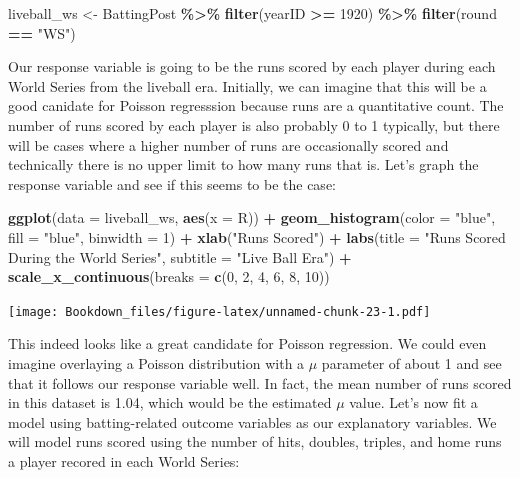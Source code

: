 \documentclass[
]{book}
\newenvironment{Shaded}{\begin{snugshade}}{\end{snugshade}}
\newcommand{\DataTypeTok}[1]{\textcolor[rgb]{0.13,0.29,0.53}{#1}}
\newcommand{\DecValTok}[1]{\textcolor[rgb]{0.00,0.00,0.81}{#1}}
\newcommand{\KeywordTok}[1]{\textcolor[rgb]{0.13,0.29,0.53}{\textbf{#1}}}
\newcommand{\NormalTok}[1]{#1}
\newcommand{\OperatorTok}[1]{\textcolor[rgb]{0.81,0.36,0.00}{\textbf{#1}}}
\newcommand{\StringTok}[1]{\textcolor[rgb]{0.31,0.60,0.02}{#1}}
\begin{document}
\begin{Shaded}
\begin{Highlighting}[]
\NormalTok{liveball\_ws \textless{}{-}}\StringTok{ }\NormalTok{BattingPost }\OperatorTok{\%\textgreater{}\%}
\StringTok{  }\KeywordTok{filter}\NormalTok{(yearID }\OperatorTok{\textgreater{}=}\StringTok{ }\DecValTok{1920}\NormalTok{) }\OperatorTok{\%\textgreater{}\%}
\StringTok{  }\KeywordTok{filter}\NormalTok{(round }\OperatorTok{==}\StringTok{ "WS"}\NormalTok{)}
\end{Highlighting}
\end{Shaded}

Our response variable is going to be the runs scored by each player during each World Series from the liveball era. Initially, we can imagine that this will be a good canidate for Poisson regresssion because runs are a quantitative count. The number of runs scored by each player is also probably 0 to 1 typically, but there will be cases where a higher number of runs are occasionally scored and technically there is no upper limit to how many runs that is. Let's graph the response variable and see if this seems to be the case:

\begin{Shaded}
\begin{Highlighting}[]
\KeywordTok{ggplot}\NormalTok{(}\DataTypeTok{data =}\NormalTok{ liveball\_ws, }\KeywordTok{aes}\NormalTok{(}\DataTypeTok{x =}\NormalTok{ R)) }\OperatorTok{+}
\StringTok{  }\KeywordTok{geom\_histogram}\NormalTok{(}\DataTypeTok{color =} \StringTok{"blue"}\NormalTok{, }\DataTypeTok{fill =} \StringTok{"blue"}\NormalTok{, }\DataTypeTok{binwidth =} \DecValTok{1}\NormalTok{) }\OperatorTok{+}
\StringTok{  }\KeywordTok{xlab}\NormalTok{(}\StringTok{"Runs Scored"}\NormalTok{) }\OperatorTok{+}
\StringTok{  }\KeywordTok{labs}\NormalTok{(}\DataTypeTok{title =} \StringTok{"Runs Scored During the World Series"}\NormalTok{, }
       \DataTypeTok{subtitle =} \StringTok{"Live Ball Era"}\NormalTok{) }\OperatorTok{+}
\StringTok{  }\KeywordTok{scale\_x\_continuous}\NormalTok{(}\DataTypeTok{breaks =} \KeywordTok{c}\NormalTok{(}\DecValTok{0}\NormalTok{, }\DecValTok{2}\NormalTok{, }\DecValTok{4}\NormalTok{, }\DecValTok{6}\NormalTok{, }\DecValTok{8}\NormalTok{, }\DecValTok{10}\NormalTok{)) }
\end{Highlighting}
\end{Shaded}

\texttt{[image: Bookdown\_files/figure-latex/unnamed-chunk-23-1.pdf]}

This indeed looks like a great candidate for Poisson regression. We could even imagine overlaying a Poisson distribution with a \(\mu\) parameter of about 1 and see that it follows our response variable well. In fact, the mean number of runs scored in this dataset is 1.04, which would be the estimated \(\mu\) value. Let's now fit a model using batting-related outcome variables as our explanatory variables. We will model runs scored using the number of hits, doubles, triples, and home runs a player recored in each World Series:
\end{document}

